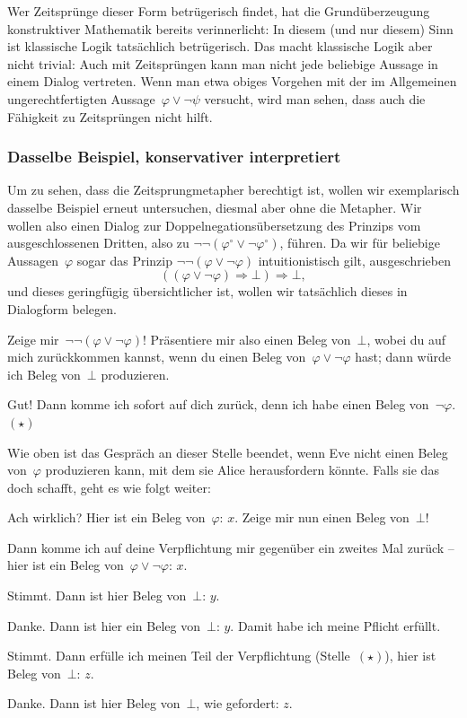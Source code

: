 \documentclass[a4paper,ngerman,12pt]{scrartcl}
\theoremstyle{definition}
\theoremstyle{plain}
\theoremstyle{remark}
\renewcommand{\_}{\mathpunct{.}\,}
\newcommand{\?}{\,{:}\,}
\newcommand{\Alice}{\item[Alice]}
\newcommand{\Eve}{\item[Eve]}
\newenvironment{dialogue}[1]{%
  \begin{list}{}{%
    \settowidth{\labelwidth}{\qquad\emph{#1:}}
    \setlength{\labelsep}{0.3cm}
    \setlength{\leftmargin}{\labelwidth}
    \addtolength{\leftmargin}{\labelsep}
    \setlength{\rightmargin}{0pt}
    \setlength{\parsep}{0.5ex plus 0.2ex minus 0.1ex}
    \setlength{\itemsep}{0 ex plus 0.2ex}
    \renewcommand{\makelabel}[1]{\qquad\emph{##1:}\hfil}
    }
}{\end{list}}
\begin{document}
Wer Zeitsprünge dieser Form betrügerisch findet, hat die
Grund\-über\-zeu\-gung konstruktiver Mathematik bereits verinnerlicht: In diesem (und
nur diesem) Sinn ist klassische Logik tatsächlich betrügerisch. Das macht
klassische Logik aber nicht trivial: Auch mit Zeitsprüngen kann man nicht jede
beliebige Aussage in einem Dialog vertreten. Wenn man etwa obiges Vorgehen
mit der im Allgemeinen ungerechtfertigten Aussage~$\varphi \vee \neg\psi$
versucht, wird man sehen, dass auch die Fähigkeit zu Zeitsprüngen
nicht hilft.


\subsubsection*{Dasselbe Beispiel, konservativer interpretiert}

Um zu sehen, dass die Zeitsprungmetapher berechtigt ist, wollen wir
exemplarisch dasselbe Beispiel erneut untersuchen, diesmal aber ohne die
Metapher. Wir wollen also einen
Dialog zur
Dop\-pel\-ne\-ga\-tions\-über\-set\-zung des Prinzips vom ausgeschlossenen
Dritten, also zu $\neg\neg(\varphi^\circ \vee \neg\varphi^\circ)$, führen. Da wir
für beliebige Aussagen~$\varphi$ sogar das Prinzip $\neg\neg(\varphi \vee
\neg\varphi)$ intuitionistisch gilt, ausgeschrieben
\[ ((\varphi \vee \neg\varphi) \Rightarrow \bot) \Rightarrow \bot, \]
und dieses geringfügig übersichtlicher ist, wollen wir tatsächlich dieses in Dialogform
belegen.

\begin{dialogue}{Alice}
\Eve Zeige mir~$\neg\neg(\varphi \vee \neg\varphi)$!
Präsentiere mir also einen Beleg von~$\bot$, wobei du auf mich zurückkommen
kannst, wenn du einen Beleg von~$\varphi \vee \neg\varphi$ hast; dann
würde ich Beleg von~$\bot$ produzieren.
\Alice Gut! Dann komme ich sofort auf dich zurück, denn ich habe einen Beleg
von~$\neg\varphi$. $(\star)$
\end{dialogue}

Wie oben ist das Gespräch an dieser Stelle beendet, wenn Eve nicht einen Beleg
von~$\varphi$ produzieren kann, mit dem sie Alice herausfordern könnte. Falls
sie das doch schafft, geht es wie folgt weiter:

\begin{dialogue}{Alice}
\Eve Ach wirklich? Hier ist ein Beleg von~$\varphi$: $x$. Zeige mir nun einen
Beleg von~$\bot$!
\Alice Dann komme ich auf deine Verpflichtung mir gegenüber ein zweites Mal
zurück -- hier ist ein Beleg von~$\varphi \vee \neg\varphi$: $x$.
\Eve Stimmt. Dann ist hier Beleg von~$\bot$: $y$.
\Alice Danke. Dann ist hier ein Beleg von~$\bot$: $y$. Damit habe ich meine
Pflicht erfüllt.
\Eve Stimmt. Dann erfülle ich meinen Teil der Verpflichtung (Stelle~$(\star)$),
hier ist Beleg von~$\bot$: $z$.
\Alice Danke. Dann ist hier Beleg von~$\bot$, wie gefordert: $z$.
\end{dialogue}
\end{document}
